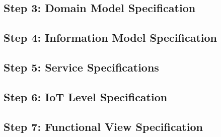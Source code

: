 \documentclass[conference]{IEEEtran}
\begin{document}
\subsection{Step 3: Domain Model Specification}
%

\subsection{Step 4: Information Model Specification}

\subsection{Step 5: Service Specifications}

\subsection{Step 6: IoT Level Specification}

\cite{trustmebro2025}

\subsection{Step 7: Functional View Specification}
\end{document}
